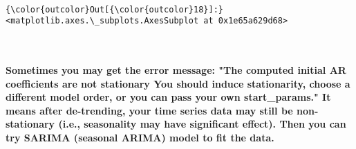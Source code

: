 \documentclass[11pt]{article}
\begin{document}
    
    \begin{center}
    \end{center}
    { \hspace*{\fill} \\}
    
\begin{Verbatim}[commandchars=\\\{\}]
{\color{outcolor}Out[{\color{outcolor}18}]:} <matplotlib.axes.\_subplots.AxesSubplot at 0x1e65a629d68>
\end{Verbatim}
            
    \begin{center}
    \end{center}
    { \hspace*{\fill} \\}
    
    \paragraph{Sometimes you may get the error message: "The computed
initial AR coefficients are not stationary You should induce
stationarity, choose a different model order, or you can pass your own
start\_params." It means after de-trending, your time series data may
still be non-stationary (i.e., seasonality may have significant effect).
Then you can try SARIMA (seasonal ARIMA) model to fit the
data.}\label{sometimes-you-may-get-the-error-message-the-computed-initial-ar-coefficients-are-not-stationary-you-should-induce-stationarity-choose-a-different-model-order-or-you-can-pass-your-own-start_params.-it-means-after-de-trending-your-time-series-data-may-still-be-non-stationary-i.e.-seasonality-may-have-significant-effect.-then-you-can-try-sarima-seasonal-arima-model-to-fit-the-data.}
\end{document}
